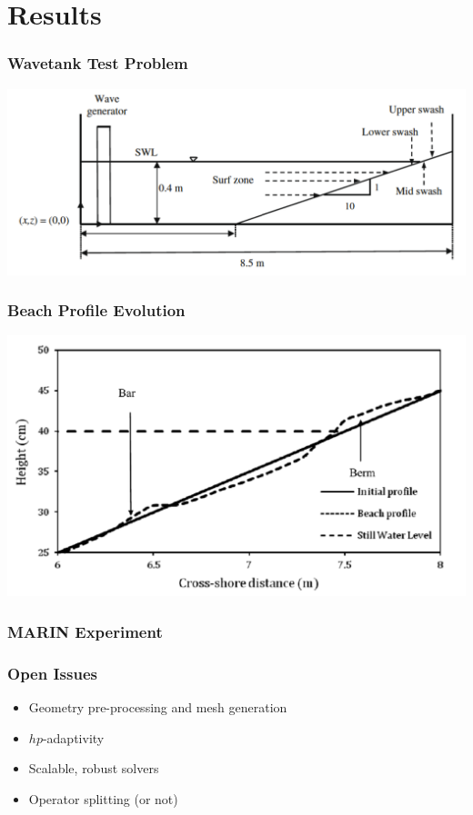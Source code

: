 \documentclass{beamer}
\begin{document}
\section{Results}

\begin{frame}
\frametitle{Wavetank Test Problem}
\includegraphics[width=\textwidth,keepaspectratio=true]{wavetank.pdf}
\end{frame}

\begin{frame}
\frametitle{Beach Profile Evolution}
\includegraphics[width=\textwidth,keepaspectratio=true]{beachProfile.pdf}
\end{frame}

\begin{frame}
\frametitle{MARIN Experiment}
\end{frame}

\begin{frame}
\frametitle{Open Issues}
\begin{itemize}
\item Geometry pre-processing and mesh generation
\item $hp$-adaptivity
\item Scalable, robust solvers
\item Operator splitting (or not)
\end{itemize}
\end{frame}
\end{document}
